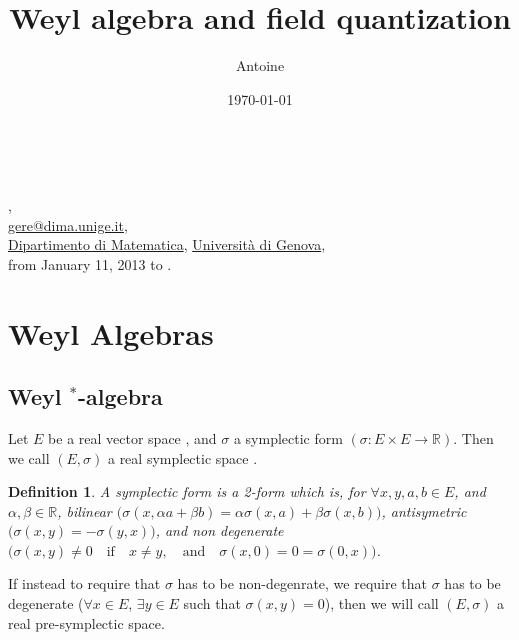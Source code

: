 \documentclass[10pt]{article} %
\makeatletter
\newcommand{\version}{\today} %
\numberwithin{equation}{section}
\numberwithin{equation}{section} %
\numberwithin{figure}{section} %
\newcommand{\labo}[2]{\newcommand{\@labo}{\href{#2}{#1}}}
\newcommand{\univ}[2]{\newcommand{\@univ}{\href{#2}{#1}}}
\newcommand{\address}[1]{\newcommand{\@address}{\href{mailto:#1}{#1}}}
\renewcommand{\maketitle}{
 { %
  \tt
  \begin{flushleft}
   \noindent\@author, \\
   \@address, \\
   \@labo, \@univ, \\
   from January 11, 2013 to \@date.
  \end{flushleft}
 }
 \vspace{1.0\baselineskip} 
 { %
  \begin{flushright}
   \LARGE \bf
   \noindent\ignorespaces\texttt{\@title}
  \end{flushright}
 }
}
\theoremstyle{theoremsf}
\theoremstyle{definitionsf}
\newtheorem{dfn}{Definition}[section]
\makeatother
\begin{document}



\title{Weyl algebra and field quantization}
\author{Antoine}
\address{gere@dima.unige.it}
\labo{Dipartimento di Matematica}{http://www.dima.unige.it/}
\univ{Università di Genova}{http://www.unige.it/}
\date{\version}

\maketitle


\tableofcontents


\section{Weyl Algebras}

\subsection{Weyl $^{\ast}$-algebra}

\noindent
Let $E$ be a real vector space \cite{weisRealVectorSpace}, and $\sigma$ a symplectic form $(\sigma : E \times E \to \mathbb{R} )$. Then we call $(E,\sigma)$ a real symplectic space \cite{weisSymplecticSpace}. 

\begin{dfn} \label{SympForm}
 A symplectic form \cite{weisSymplecticForm} is a 2-form which is, for $\forall x,y,a,b \in E$, and $\alpha, \beta \in \mathbb{R}$, bilinear $\big( \sigma(x, \alpha a + \beta b) = \alpha \sigma(x,a) + \beta \sigma(x,b) \big)$, antisymetric $\big( \sigma(x,y) = - \sigma(y,x) \big)$, and non degenerate $\big( \sigma(x,y) \neq 0 \quad \text{if} \quad x \neq y, \quad \text{and} \quad \sigma(x,0) = 0 = \sigma(0,x) \big)$.
\end{dfn}

\noindent
If instead to require that $\sigma$ has to be non-degenrate, we require that $\sigma$ has to be degenerate ($ \forall x \in E $, $ \exists y \in E$ such that $\sigma(x,y)=0$), then we will call $(E,\sigma)$ a real  pre-symplectic space.\\ 
\end{document}
